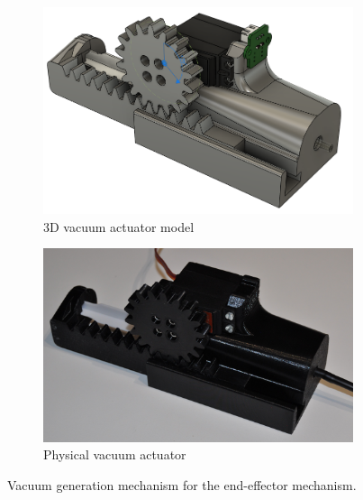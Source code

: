 \begin{figure}[!ht]
	\centering
	\begin{subfigure}{.49\textwidth}
		\centering
		\includegraphics[width=1\linewidth]{figures/vacuum-actuator-model.PNG}
		\caption{3D vacuum actuator model}
		\label{fig:vacuum-actuator-model}
	\end{subfigure}%
	\begin{subfigure}{.49\textwidth}
		\centering
		\includegraphics[width=1\linewidth]{figures/vacuum-actuator.JPG}
		\caption{Physical vacuum actuator}
		\label{fig:vacuum-actuator}
	\end{subfigure}%
	\caption{Vacuum generation mechanism for the end-effector mechanism.}
	\label{fig:vacuum-generator}
\end{figure}

